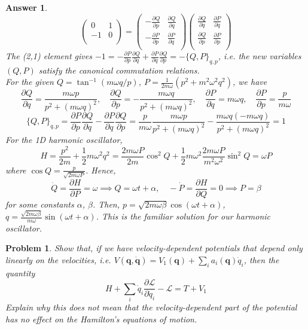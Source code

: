 \documentclass[a4paper]{article}
\newtheorem{ans}{Answer}[section]
\theoremstyle{new}
\newtheorem{qns}{Problem}[section]
\begin{document}
\begin{ans}
$$\begin{pmatrix}0&1\\-1&0\\\end{pmatrix}=\begin{pmatrix}-\frac{\partial Q}{\partial p}&\frac{\partial Q}{\partial q}\\-\frac{\partial P}{\partial p}&\frac{\partial P}{\partial q}\\\end{pmatrix}\begin{pmatrix}\frac{\partial Q}{\partial q}&\frac{\partial P}{\partial q}\\\frac{\partial Q}{\partial p}&\frac{\partial P}{\partial p}\\\end{pmatrix}$$
The (2,1) element gives $-1=-\frac{\partial P}{\partial p}\frac{\partial Q}{\partial q}+\frac{\partial P}{\partial q}\frac{\partial Q}{\partial p}=-\{Q,P\}_{q,p}$, i.e. the new variables $(Q,P)$ satisfy the canonical commutation relations.\\[5pt]
For the given $Q=\tan^{-1}(m\omega q/p)$, $P=\frac{1}{2m\omega}(p^2+m^2\omega^2q^2)$, we have
$$\frac{\partial Q}{\partial q}=\frac{m\omega p}{p^2+(m\omega q)^2},\quad\frac{\partial Q}{\partial p}=-\frac{m\omega q}{p^2+(m\omega q)^2},\quad\frac{\partial P}{\partial q}=m\omega q,\quad\frac{\partial P}{\partial p}=\frac{p}{m\omega}$$
$$\{Q,P\}_{q,p}=\frac{\partial P}{\partial p}\frac{\partial Q}{\partial q}-\frac{\partial P}{\partial q}\frac{\partial Q}{\partial p}=\frac{p}{m\omega}\frac{m\omega p}{p^2+(m\omega q)^2}-\frac{m\omega q(-m\omega q)}{p^2+(m\omega q)^2}=1$$
For the 1D harmonic oscillator,
$$H=\frac{p^2}{2m}+\frac{1}{2}m\omega^2q^2=\frac{2m\omega P}{2m}\cos^2Q+\frac{1}{2}m\omega^2\frac{2m\omega P}{m^2\omega^2}\sin^2Q=\omega P$$
where $\cos Q=\frac{p}{\sqrt{2m\omega P}}$. Hence,
$$\dot{Q}=\frac{\partial H}{\partial P}=\omega\implies Q=\omega t+\alpha,\quad-\dot{P}=\frac{\partial H}{\partial Q}=0\implies P=\beta$$
for some constants $\alpha$, $\beta$. Then, $p=\sqrt{2m\omega\beta}\cos(\omega t+\alpha)$, $q=\frac{\sqrt{2m\omega\beta}}{m\omega}\sin(\omega t+\alpha)$. This is the familiar solution for our harmonic oscillator.
\end{ans}
\newpage
\begin{qns}
Show that, if we have velocity-dependent potentials that depend only linearly on the velocities, i.e. $V(\mathbf{q},\mathbf{\dot{q}})=V_1(\mathbf{q})+\sum_ia_i(\mathbf{q})\dot{q}_i$, then the quantity
$$H+\sum_i\dot{q}_i\frac{\partial\mathcal{L}}{\partial\dot{q}_i}-\mathcal{L}=T+V_1$$
Explain why this does not mean that the velocity-dependent part of the potential has no effect on the Hamilton's equations of motion.
\end{qns}
\end{document}
